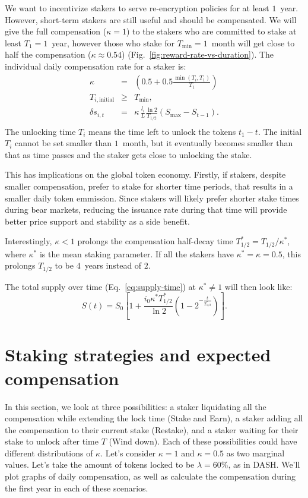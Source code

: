 \documentclass[longbibliography,nofootinbib,twocolumn]{revtex4-1}
\newcommand{\figref}[1]{Fig.~\ref{#1}}
\begin{document}
We want to incentivize stakers to serve re-encryption policies for at least $1$~year.
However, short-term stakers are still useful and should be compensated.
We will give the full compensation ($\kappa=1$) to the stakers who are committed to stake at least $T_1=1$~year,
however those who stake for $T_{\min}=1$~month will get close to half the compensation ($\kappa\approx0.54$) (\figref{fig:reward-rate-vs-duration}).
The individual daily compensation rate for a staker is:
\begin{eqnarray}
    \kappa &=& \left(0.5 + 0.5\frac{\min(T_i, T_1)}{T_1}\right)\\
    T_{i,\text{initial}} &\ge& T_{\min},\\
    \delta s_{i,t} &=&  \kappa\, \frac{l_i}{L} \frac{\ln{2}}{T_{1/2}} \left( S_{\max} - S_{t-1}\right).\\
\end{eqnarray}
The unlocking time $T_i$ means the time left to unlock the tokens $t_1 - t$.
The initial $T_i$ cannot be set smaller than $1$~month,
but it eventually becomes smaller than that as time passes and the staker gets close to unlocking the stake.

This has implications on the global token economy.
Firstly, if stakers, despite smaller compensation, prefer to stake for shorter time periods, that results in a smaller daily token emmission.
Since stakers will likely prefer shorter stake times during bear markets, reducing the issuance rate during that time will provide better price support and stability
as a side benefit.

Interestingly, $\kappa < 1$ prolongs the compensation half-decay time $T_{1/2}^* = T_{1/2} / \kappa^*$, where $\kappa^*$ is the mean staking parameter.
If all the stakers have $\kappa^* = \kappa = 0.5$, this prolongs $T_{1/2}$ to be $4$~years instead of $2$.

The total supply over time (Eq.~\ref{eq:supply-time}) at $\kappa^* \ne 1$ will then look like:
\begin{equation}
    \label{eq:adjusted-supply-time}
    S(t) = S_0 \left[1 + \frac{i_0 \kappa^* T_{1/2}^*}{\ln{2}}\left(1 - 2^{-\frac{t}{T_{1/2}^*}} \right) \right].
\end{equation}

\section{Staking strategies and expected compensation}

In this section, we look at three possibilities:
a staker liquidating all the compensation while extending the lock time (Stake and Earn),
a staker adding all the compensation to their current stake (Restake),
and a staker waiting for their stake to unlock after time $T$ (Wind down).
Each of these possibilities could have different distributions of $\kappa$.
Let's consider $\kappa=1$ and $\kappa=0.5$ as two marginal values.
Let's take the amount of tokens locked to be $\lambda=60\%$, as in DASH.
We'll plot graphs of daily compensation, as well as calculate the compensation during the first year in each of these scenarios.
\end{document}
